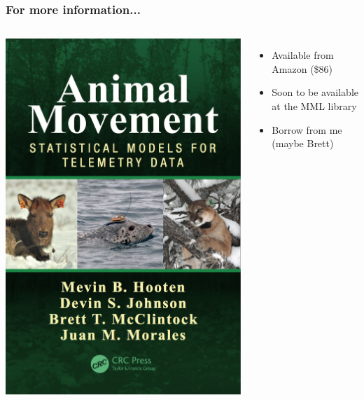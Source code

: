\documentclass[36pt]{beamer}
\begin{document}
\begin{frame}
\frametitle{For more information...}
\begin{columns}

\begin{center}
\includegraphics[height=0.75\textheight]{Book_Cover_Final.png}
\end{center}

\begin{itemize}
	\item Available from Amazon (\$86)
	\item Soon to be available at the MML library
	\item Borrow from me (maybe Brett)
\end{itemize}

\end{columns}
\end{frame}
\end{document}
